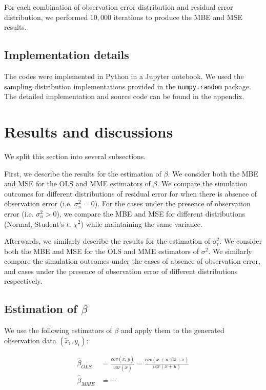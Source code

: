 \documentclass{article}
\begin{document}
For each combination of observation error distribution and residual error distribution, we performed $10,000$ iterations to produce the MBE and MSE results.

\subsection{Implementation details}

The codes were implemented in Python in a Jupyter notebook. We used the sampling distribution implementations provided in the \verb|numpy.random| package. The detailed implementation and source code can be found in the appendix.

\section{Results and discussions}

We split this section into several subsections.

First, we describe the results for the estimation of $\beta$.
We consider both the MBE and MSE for the OLS and MME estimators of $\beta$. 
We compare the simulation outcomes for different distributions of residual error for when there is absence of observation error (i.e. $\sigma^2_u = 0$).
For the cases under the presence of observation error (i.e. $\sigma^2_u > 0$), we compare the MBE and MSE for different distributions (Normal, Student's $t$, $\chi^2$) while maintaining the same variance.

Afterwards, we similarly describe the results for the estimation of $\sigma^2_\epsilon$.
We consider both the MBE and MSE for the OLS and MME estimators of $\sigma^2$.
We similarly compare the simulation outcomes under the cases of absence of observation error, and cases under the presence of observation error of different distributions respectively.

\subsection{Estimation of $\beta$}

We use the following estimators of $\beta$ and apply them to the generated observation data $(\tilde{x}_i, y_i)$:

\begin{equation}
    \begin{split}
        \hat{\beta}_{OLS} &= \frac{cov(\tilde{x, y})}{var(\tilde{x})} = \frac{cov(x+u, \beta x + \epsilon)}{var(x + u)}\\
        \hat{\beta}_{MME} &= \cdots\\
    \end{split}
\end{equation}
\end{document}
